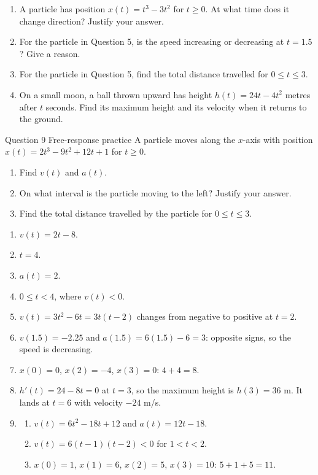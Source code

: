 \documentclass[11pt]{article}
\begin{document}
\begin{enumerate}[leftmargin=*,itemsep=2pt,start=5]
  \item A particle has position $x(t)=t^3-3t^2$ for $t\ge0$. At what time does it change direction? Justify your answer.\work{2.8cm}
  \item For the particle in Question 5, is the speed increasing or decreasing at $t=1.5$? Give a reason.\work{2.8cm}
  \item For the particle in Question 5, find the total distance travelled for $0\le t\le3$.\work{2.8cm}
  \item On a small moon, a ball thrown upward has height $h(t)=24t-4t^2$ metres after $t$ seconds. Find its maximum height and its velocity when it returns to the ground.\work{2.8cm}
\end{enumerate}

\begin{frbox}{Question 9 \textperiodcentered{} Free-response practice}
A particle moves along the $x$-axis with position $x(t)=2t^3-9t^2+12t+1$ for $t\ge0$.
\begin{enumerate}[label=(\alph*),leftmargin=*,itemsep=2pt]
  \item Find $v(t)$ and $a(t)$.\work{2.6cm}
  \item On what interval is the particle moving to the left? Justify your answer.\work{2.6cm}
  \item Find the total distance travelled by the particle for $0\le t\le3$.\work{2.6cm}
\end{enumerate}
\end{frbox}

\newpage
\begin{solbox}
\begin{enumerate}[leftmargin=*,itemsep=4pt]
  \item $v(t)=2t-8$.
  \item $t=4$.
  \item $a(t)=2$.
  \item $0\le t<4$, where $v(t)<0$.
  \item $v(t)=3t^2-6t=3t(t-2)$ changes from negative to positive at $t=2$.
  \item $v(1.5)=-2.25$ and $a(1.5)=6(1.5)-6=3$: opposite signs, so the speed is decreasing.
  \item $x(0)=0$, $x(2)=-4$, $x(3)=0$: $4+4=8$.
  \item $h'(t)=24-8t=0$ at $t=3$, so the maximum height is $h(3)=36$ m. It lands at $t=6$ with velocity $-24$ m/s.
  \item \begin{enumerate}[label=(\alph*),leftmargin=*,itemsep=3pt]
    \item $v(t)=6t^2-18t+12$ and $a(t)=12t-18$.
    \item $v(t)=6(t-1)(t-2)<0$ for $1<t<2$.
    \item $x(0)=1$, $x(1)=6$, $x(2)=5$, $x(3)=10$: $5+1+5=11$.
  \end{enumerate}
\end{enumerate}
\end{solbox}
\end{document}
